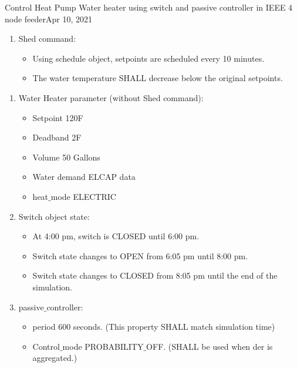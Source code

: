 \begin{entry}{Control Heat Pump Water heater using switch and passive controller in IEEE 4 node feeder}{Apr 10, 2021}
\begin{enumerate}
        \begin{itemize}
            \item Import market module
            \item Set up auction object with prices source file.
            \item Set up a player object that contains prices data. This object is auction object's child.
        \end{itemize}
        \item Shed command:
        \begin{itemize}
            \item Using schedule object, setpoints are scheduled every 10 minutes.
            \item The water temperature SHALL decrease below the original setpoints. 
        \end{itemize}
    \end{enumerate}
    \parameters
    \begin{enumerate}
        \item Water Heater parameter (without Shed command):
        \begin{itemize}
        \item Setpoint 120F
        \item Deadband 2F
        \item Volume 50 Gallons
        \item Water demand ELCAP data
        \item heat$\_$mode ELECTRIC
        \end{itemize}
        \item Switch object state:
            \begin{itemize}
                \item At 4:00 pm, switch is CLOSED until 6:00 pm.
                \item Switch state changes to OPEN from 6:05 pm until 8:00 pm.
                \item Switch state changes to CLOSED from 8:05 pm until the end of the simulation.
            \end{itemize}
        \item passive$\_$controller:
            \begin{itemize}
                \item period 600 seconds. (This property SHALL match simulation time)
                \item Control$\_$mode PROBABILITY$\_$OFF. (SHALL be used when der is aggregated.)

\end{itemize}
\end{enumerate}
\end{entry}
